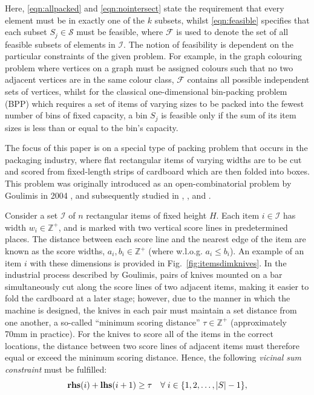 \documentclass{IEEEtran}
\begin{document}
\noindent Here, \eqref{eqn:allpacked} and \eqref{eqn:nointersect} state the requirement that every element must be in exactly one of the $k$ subsets, whilst \eqref{eqn:feasible} specifies that each subset $S_j \in \mathcal{S}$ must be feasible, where $\mathcal{F}$ is used to denote the set of all feasible subsets of elements in $\mathcal{I}$. The notion of feasibility is dependent on the particular constraints of the given problem. For example, in the graph colouring problem where vertices on a graph must be assigned colours such that no two adjacent vertices are in the same colour class, $\mathcal{F}$ contains all possible independent sets of vertices, whilst for the classical one-dimensional bin-packing problem (BPP) which requires a set of items of varying sizes to be packed into the fewest number of bins of fixed capacity, a bin $S_j$ is feasible only if the sum of its item sizes is less than or equal to the bin's capacity.

The focus of this paper is on a special type of packing problem that occurs in the packaging industry, where flat rectangular items of varying widths are to be cut and scored from fixed-length strips of cardboard which are then folded into boxes. This problem was originally introduced as an open-combinatorial problem by Goulimis in 2004 \cite{goulimis2004}, and subsequently studied in \cite{lewis2011}, \cite{becker2015}, and \cite{hawa2018}.

Consider a set $\mathcal{I}$ of $n$ rectangular items of fixed height $H$. Each item $i \in \mathcal{I}$ has width $w_i \in \mathbb{Z}^+$, and is marked with two vertical score lines in predetermined places. The distance between each score line and the nearest edge of the item are known as the score widths, $a_i, b_i \in \mathbb{Z}^+$ (where w.l.o.g. $a_i \leq b_i$). An example of an item $i$ with these dimensions is provided in Fig.~\ref{fig:itemsdimknives}. In the industrial process described by Goulimis, pairs of knives mounted on a bar simultaneously cut along the score lines of two adjacent items, making it easier to fold the cardboard at a later stage; however, due to the manner in which the machine is designed, the knives in each pair must maintain a set distance from one another, a so-called ``minimum scoring distance'' $\tau \in \mathbb{Z}^+$ (approximately 70mm in practice). For the knives to score all of the items in the correct locations, the distance between two score lines of adjacent items must therefore equal or exceed the minimum scoring distance. Hence, the following \emph{vicinal sum constraint} must be fulfilled:
\begin{equation}
	\textbf{rhs}(i) + \textbf{lhs}(i+1) \geq \tau \quad \forall \hspace{1mm} i \in \{1,2,\dotsc,|S|- 1\},
	\label{eqn:vsc}
\end{equation}
\end{document}
